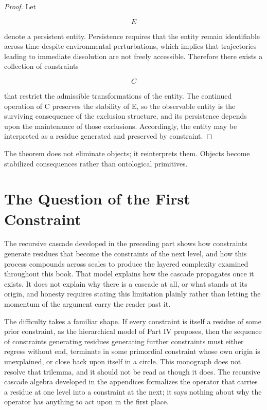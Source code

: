 \documentclass[11pt,oneside]{book}
\theoremstyle{plain}
\theoremstyle{definition}
\theoremstyle{remark}
\begin{document}
\begin{proof}
Let

\begin{equation}
E
\end{equation}

denote a persistent entity. Persistence requires that the entity remain identifiable across time despite environmental perturbations, which implies that trajectories leading to immediate dissolution are not freely accessible. Therefore there exists a collection of constraints

\begin{equation}
C
\end{equation}

that restrict the admissible transformations of the entity. The continued operation of C preserves the stability of E, so the observable entity is the surviving consequence of the exclusion structure, and its persistence depends upon the maintenance of those exclusions. Accordingly, the entity may be interpreted as a residue generated and preserved by constraint.
\end{proof}

The theorem does not eliminate objects; it reinterprets them. Objects become stabilized consequences rather than ontological primitives.

\section{The Question of the First Constraint}

The recursive cascade developed in the preceding part shows how constraints generate residues that become the constraints of the next level, and how this process compounds across scales to produce the layered complexity examined throughout this book. That model explains how the cascade propagates once it exists. It does not explain why there is a cascade at all, or what stands at its origin, and honesty requires stating this limitation plainly rather than letting the momentum of the argument carry the reader past it.

The difficulty takes a familiar shape. If every constraint is itself a residue of some prior constraint, as the hierarchical model of Part IV proposes, then the sequence of constraints generating residues generating further constraints must either regress without end, terminate in some primordial constraint whose own origin is unexplained, or close back upon itself in a circle. This monograph does not resolve that trilemma, and it should not be read as though it does. The recursive cascade algebra developed in the appendices formalizes the operator that carries a residue at one level into a constraint at the next; it says nothing about why the operator has anything to act upon in the first place.
\end{document}
